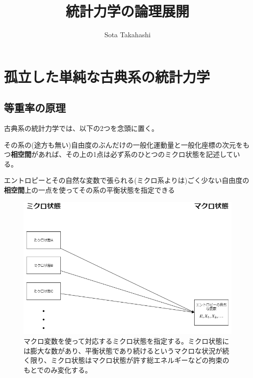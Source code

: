 \documentclass[
]{ltjsbook}
\title{統計力学の論理展開}
\author{Sota Takahashi}
\date{}
\providecommand{\tightlist}{%
  \setlength{\itemsep}{0pt}\setlength{\parskip}{0pt}}
\begin{document}
\maketitle

{
\setcounter{tocdepth}{3}
\tableofcontents
}
\hypertarget{ux5b64ux7acbux3057ux305fux5358ux7d14ux306aux53e4ux5178ux7cfbux306eux7d71ux8a08ux529bux5b66}{%
\section{孤立した単純な古典系の統計力学}\label{ux5b64ux7acbux3057ux305fux5358ux7d14ux306aux53e4ux5178ux7cfbux306eux7d71ux8a08ux529bux5b66}}

\hypertarget{ux7b49ux91cdux7387ux306eux539fux7406}{%
\subsection{等重率の原理}\label{ux7b49ux91cdux7387ux306eux539fux7406}}

古典系の統計力学では、以下の2つを念頭に置く。

\begin{description}
\tightlist
\item[\textbf{ミクロな状態}]
その系の(途方も無い)自由度のぶんだけの一般化運動量と一般化座標の次元をもつ\textbf{相空間}があれば、その上の1点は必ず系のひとつのミクロ状態を記述している。
\item[\textbf{マクロな状態}]
エントロピーとその自然な変数で張られる(ミクロ系よりは)ごく少ない自由度の\textbf{相空間}上の一点を使ってその系の平衡状態を指定できる
\end{description}

\begin{figure}
\hypertarget{fig:micro_macro}{%
\centering
\includegraphics{images/micro_macro.drawio.png}
\caption{マクロ変数を使って対応するミクロ状態を指定する。ミクロ状態には膨大な数があり、平衡状態であり続けるというマクロな状況が続く限り、ミクロ状態はマクロ状態が許す総エネルギーなどの拘束のもとでのみ変化する。}\label{fig:micro_macro}
}
\end{figure}
\end{document}
